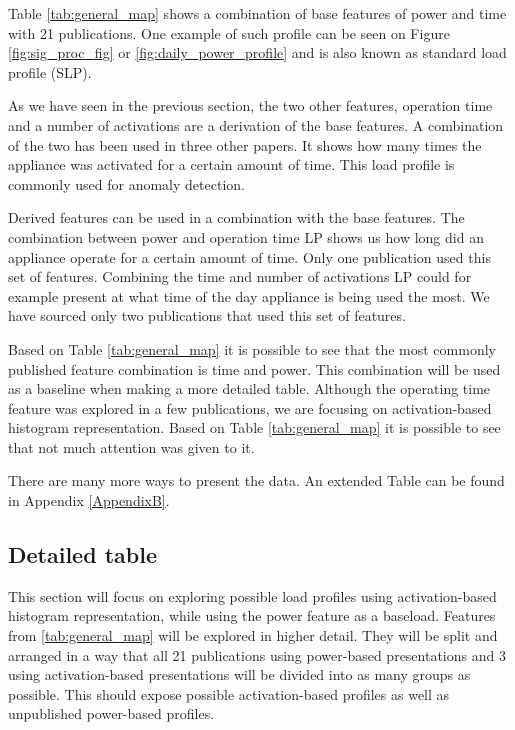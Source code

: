 \begin{table}[H]
\begin{tabular}{|c|c|c|c|c|c|}
    \end{tabular}
\end{table}

Table \ref{tab:general_map} shows a combination of base features of power and time with 21 publications. 
One example of such profile can be seen on Figure \ref{fig:sig_proc_fig} or \ref{fig:daily_power_profile} and is also known as standard load profile (SLP).

As we have seen in the previous section, the two other features, operation time and a number of activations are a derivation of the base features.
A combination of the two has been used in three other papers.
It shows how many times the appliance was activated for a certain amount of time. 
This load profile is commonly used for anomaly detection.

Derived features can be used in a combination with the base features.
The combination between power and operation time LP shows us how long did an appliance operate for a certain amount of time.
Only one publication used this set of features.
Combining the time and number of activations LP could for example present at what time of the day appliance is being used the most.
We have sourced only two publications that used this set of features.

Based on Table \ref{tab:general_map} it is possible to see that the most commonly
published feature combination is time and power. This combination will be used 
as a baseline when making a more detailed table. Although the operating time feature was 
explored in a few publications, we are focusing on activation-based histogram representation.
Based on Table \ref{tab:general_map} it is possible to see that not much attention was given to it. 

There are many more ways to present the data. An extended Table can be found in Appendix \ref{AppendixB}.

\subsection{Detailed table}

This section will focus on exploring possible load profiles using activation-based histogram representation,
while using the power feature as a baseload. 
Features from \ref{tab:general_map} will be explored in higher detail. 
They will be split and arranged in a way that all 21 publications using power-based presentations and 3 using activation-based presentations will be divided into as many groups as possible. 
This should expose possible activation-based profiles as well as unpublished power-based profiles.

